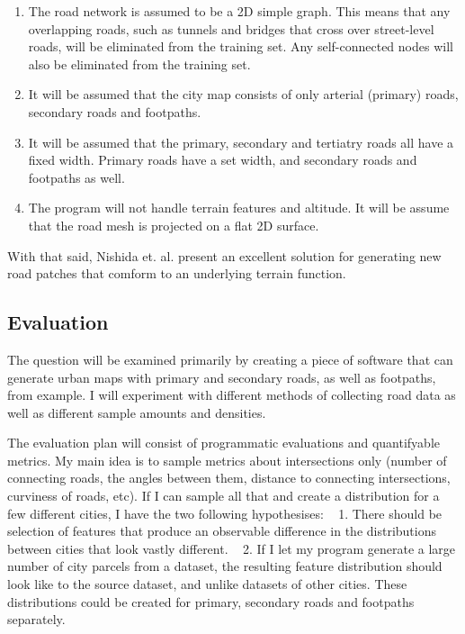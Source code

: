 \documentclass[a4paper]{article}
\begin{document}
\begin{enumerate}
\item The road network is assumed to be a 2D simple graph. This means that any overlapping roads, such as tunnels and bridges that cross over street-level roads, will be eliminated from the training set. Any self-connected nodes will also be eliminated from the training set.
\item It will be assumed that the city map consists of only arterial (primary) roads, secondary roads and footpaths.
\item It will be assumed that the primary, secondary and tertiatry roads all have a fixed width. Primary roads have a set width, and secondary roads and footpaths as well.
\item The program will not handle terrain features and altitude. It will be assume that the road mesh is projected on a flat 2D surface.
\end{enumerate}

With that said, Nishida et. al. present an excellent solution for generating new road patches that comform to an underlying terrain function.

\subsection{Evaluation}

The question will be examined primarily by creating a piece of software that can generate urban maps with primary and secondary roads, as well as footpaths, from example. I will experiment with different methods of collecting road data as well as different sample amounts and densities.

The evaluation plan will consist of programmatic evaluations and quantifyable metrics. My main idea is to sample metrics about intersections only (number of connecting roads, the angles between them, distance to connecting intersections, curviness of roads, etc). If I can sample all that and create a distribution for a few different cities, I have the two following hypothesises:
  1. There should be selection of features that produce an observable difference in the distributions between cities that look vastly different.
  2. If I let my program generate a large number of city parcels from a dataset, the resulting feature distribution should look like to the source dataset, and unlike datasets of other cities.
These distributions could be created for primary, secondary roads and footpaths separately.
\end{document}

